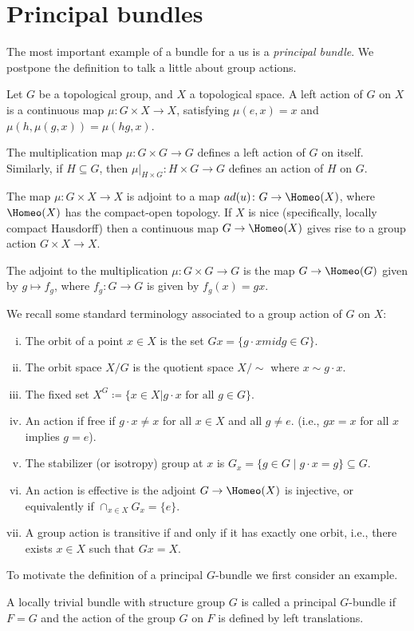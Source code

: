 \documentclass[ma3408.tex]{subfiles}
\begin{document}
\section{Principal bundles}
The most important example of a bundle for a us is a \emph{principal bundle}. We postpone the definition to talk a little about group actions. 
\begin{Def}
Let $G$ be a topological group, and $X$ a topological space. A left action of $G$ on $X$ is a continuous map $\mu \colon G \times X \to X$, satisfying $\mu(e,x) = x$ and $\mu(h,\mu(g,x)) = \mu(hg,x)$. 
\end{Def}
\begin{Exa}
The multiplication map $\mu \colon G \times G \to G$ defines a left action of $G$ on itself. Similarly, if $H \subseteq G$, then $\mu|_{H \times G} \colon H \times G \to G$ defines an action of $H$ on $G$. 
\end{Exa}
\begin{Rem}
The map $\mu \colon G \times X \to X$ is adjoint to a map $ad(u) \colon G \to \Homeo(X)$, where $\Homeo(X)$ has the compact-open topology. If $X$ is nice (specifically, locally compact Hausdorff) then a continuous map $G \to \Homeo(X)$ gives rise to a group action $G \times X \to X$. 
\end{Rem}
\begin{Exa}
The adjoint to the multiplication $\mu \colon G \times G \to G$ is the map $G \to \Homeo(G)$ given by $g \mapsto f_g$, where $f_g \colon G \to G$ is given by $f_g(x) = gx$.  
\end{Exa}
\begin{Rem}
We recall some standard terminology associated to a group action of $G$ on $X$:
\begin{enumerate}[(i)]
	\item The orbit of a point $x \in X$ is the set $Gx = \{ g \cdot x mid g \in G \}$. 
	\item The orbit space $X/G$ is the quotient space $X/\sim$ where $x \sim g \cdot x$. 
	\item The fixed set $X^G \coloneqq \{ x \in X | g \cdot x \text{ for all } g \in G \}$. 
	\item An action if free if $g \cdot x \ne x$ for all $x \in X$ and all $g \ne e$. (i.e., $gx = x$ for all $x$ implies $g = e$). 
	\item The stabilizer (or isotropy) group at $x$ is $G_x = \{ g \in G \mid g\cdot x = g \} \subseteq G$. 
	\item An action is effective is the adjoint $G \to \Homeo(X)$ is injective, or equivalently if $\cap_{x \in X} G_x = \{ e \}$.
	\item A group action is transitive if and only if it has exactly one orbit, i.e., there exists $x \in X$ such that $Gx = X$. 
\end{enumerate}
\end{Rem}
\begin{Exa}
To motivate the definition of a principal $G$-bundle we first consider an example. 
\end{Exa}
\begin{Def}
A locally trivial bundle with structure group $G$ is called a principal $G$-bundle if $F = G$ and the action of the group $G$ on $F$ is defined by left translations. 
\end{Def}
\end{document}
